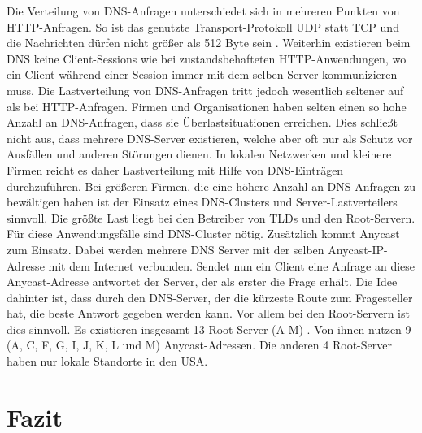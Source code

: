\documentclass[a4paper, 12pt, BCOR10mm, DIV12, toc=bibliography, toc=listof, german]{scrbook}
\begin{document}

			Die Verteilung von DNS-Anfragen unterschiedet sich in mehreren Punkten von HTTP-Anfragen. So
			ist das genutzte Transport-Protokoll UDP statt TCP und die Nachrichten dürfen nicht größer als
			512 Byte sein \cite{rfc1035}. Weiterhin existieren beim DNS keine Client-Sessions wie bei
			zustandsbehafteten HTTP-Anwendungen, wo ein Client während einer Session immer mit dem selben Server
			kommunizieren muss. Die Lastverteilung von DNS-Anfragen tritt jedoch wesentlich seltener auf
			als bei HTTP-Anfragen. Firmen und Organisationen haben selten einen so hohe Anzahl an
			DNS-Anfragen, dass sie Überlastsituationen erreichen. Dies schließt nicht aus, dass mehrere
			DNS-Server existieren, welche aber oft nur als Schutz vor Ausfällen und anderen Störungen
			dienen.  In lokalen Netzwerken und kleinere Firmen reicht es daher Lastverteilung mit Hilfe
			von DNS-Einträgen durchzuführen. Bei größeren Firmen, die eine höhere Anzahl an DNS-Anfragen
			zu bewältigen haben ist der Einsatz eines DNS-Clusters und Server-Lastverteilers sinnvoll. Die
			größte Last liegt bei den Betreiber von TLDs und den Root-Servern. Für diese Anwendungsfälle
			sind DNS-Cluster nötig. Zusätzlich kommt Anycast \cite{rfc4786, sapate2005} zum Einsatz. Dabei
			werden mehrere DNS Server mit der selben Anycast-IP-Adresse mit dem Internet verbunden. Sendet
			nun ein Client eine Anfrage an diese Anycast-Adresse antwortet der Server, der als erster die
			Frage erhält. Die Idee dahinter ist, dass durch den DNS-Server, der die kürzeste Route zum
			Fragesteller hat, die beste Antwort gegeben werden kann. Vor allem bei den Root-Servern ist
			dies sinnvoll. Es existieren insgesamt 13 Root-Server
			(A-M) \cite{rootserver}. Von ihnen nutzen 9 (A, C, F, G, I, J, K, L und M)
			Anycast-Adressen. Die anderen 4 Root-Server haben nur lokale Standorte in den USA. 
				


		\section{Fazit} %
		\label{sec:grundlagen-fazit}
		


\end{document}
